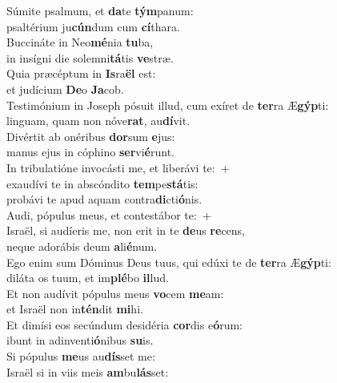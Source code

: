 \evenverse Súmite psalmum, et \textbf{da}te \textbf{tým}panum:~\*\\
\evenverse psaltérium ju\textbf{cún}dum cum \textbf{cí}thara.\\
\oddverse Buccináte in Neo\textbf{mé}nia \textbf{tu}ba,~\*\\
\oddverse in insígni die solemni\textbf{tá}tis \textbf{ve}stræ.\\
\evenverse Quia præcéptum in \textbf{Is}ra\textbf{ël} est:~\*\\
\evenverse et judícium \textbf{De}o \textbf{Ja}cob.\\
\oddverse Testimónium in Joseph pósuit illud, cum exíret de \textbf{ter}ra Æ\textbf{gýp}ti:~\*\\
\oddverse linguam, quam non nóve\textbf{rat}, au\textbf{dí}vit.\\
\evenverse Divértit ab onéribus \textbf{dor}sum \textbf{e}jus:~\*\\
\evenverse manus ejus in cóphino \textbf{ser}vi\textbf{é}runt.\\
\oddverse In tribulatióne invocásti me, et liberávi te:~+\\
\oddverse  exaudívi te in abscóndito \textbf{tem}pe\textbf{stá}tis:~\*\\
\oddverse probávi te apud aquam contra\textbf{di}cti\textbf{ó}nis.\\
\evenverse Audi, pópulus meus, et contestábor te:~+\\
\evenverse  Israël, si audíeris me, non erit in te \textbf{de}us \textbf{re}cens,~\*\\
\evenverse neque adorábis deum \textbf{a}li\textbf{é}num.\\
\oddverse Ego enim sum Dóminus Deus tuus, qui edúxi te de \textbf{ter}ra Æ\textbf{gýp}ti:~\*\\
\oddverse diláta os tuum, et im\textbf{plé}bo \textbf{il}lud.\\
\evenverse Et non audívit pópulus meus \textbf{vo}cem \textbf{me}am:~\*\\
\evenverse et Israël non in\textbf{tén}dit \textbf{mi}hi.\\
\oddverse Et dimísi eos secúndum desidéria \textbf{cor}dis e\textbf{ó}rum:~\*\\
\oddverse ibunt in adinventi\textbf{ó}nibus \textbf{su}is.\\
\evenverse Si pópulus \textbf{me}us au\textbf{dís}set me:~\*\\
\evenverse Israël si in viis meis \textbf{am}bu\textbf{lás}set:\\
